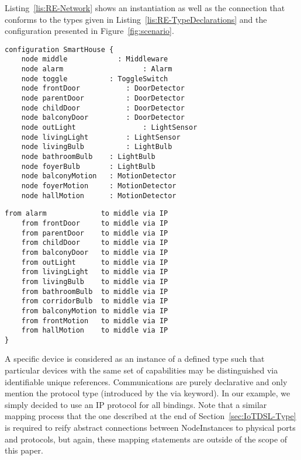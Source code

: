 Listing~\ref{lis:RE-Network} shows an instantiation as well as the connection that conforms to the types given in Listing~\ref{lis:RE-TypeDeclarations} and the configuration presented in Figure~\ref{fig:scenario}.
	
	
\begin{table}
	\begin{minipage}[b]{.45\textwidth }%
		\begin{lstlisting}[language=iotdsl]	
configuration SmartHouse {
	node middle   		   : Middleware
	node alarm					 : Alarm
	node toggle          : ToggleSwitch
	node frontDoor			 : DoorDetector
	node parentDoor			 : DoorDetector
	node childDoor			 : DoorDetector
	node balconyDoor 		 : DoorDetector
	node outLight				 : LightSensor
	node livingLight		 : LightSensor
	node livingBulb			 : LightBulb
	node bathroomBulb    : LightBulb
	node foyerBulb       : LightBulb
	node balconyMotion	 : MotionDetector
	node foyerMotion  	 : MotionDetector
	node hallMotion	     : MotionDetector
		\end{lstlisting}
	\end{minipage}\hfill%
	\begin{minipage}[b]{.45\textwidth}
		\begin{lstlisting}[language=iotdsl, firstnumber=17]
	from alarm			   to middle via IP
	from frontDoor 	   to middle via IP
	from parentDoor    to middle via IP
	from childDoor     to middle via IP
	from balconyDoor   to middle via IP
	from outLight      to middle via IP
	from livingLight   to middle via IP
	from livingBulb    to middle via IP
	from bathroomBulb  to middle via IP
	from corridorBulb  to middle via IP
	from balconyMotion to middle via IP
	from frontMotion   to middle via IP
	from hallMotion    to middle via IP
}
		\end{lstlisting}
		\vspace*{.3cm}
	\end{minipage}
	\label{lis:RE-Network}
\end{table}
	
A specific device is considered as an instance of a defined type such that particular devices with the same set of capabilities may be distinguished via identifiable unique references. Communications are purely declarative and only mention the protocol type (introduced by the \textsf{via} keyword). In our example, we simply decided to use an \textsf{IP} protocol for all bindings. Note that a similar mapping process that the one described at the end of Section~\ref{sec:IoTDSL-Type} is required to reify abstract connections between \textsf{NodeInstances} to physical ports and protocols, but again, these mapping statements are outside of the scope of this paper. 

